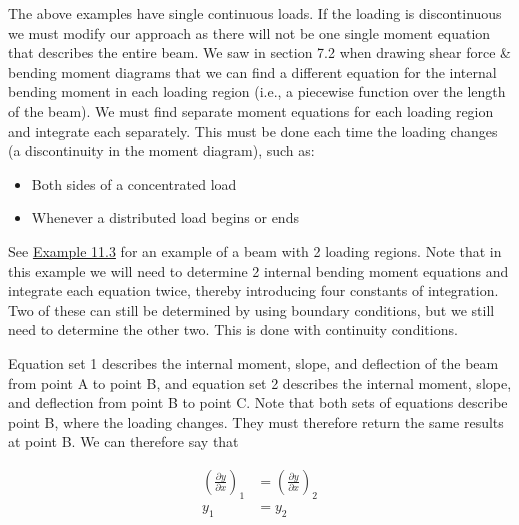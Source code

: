 \documentclass[
  letterpaper,
  DIV=11,
  numbers=noendperiod]{scrreprt}
\begin{document}
The above examples have single continuous loads. If the loading is
discontinuous we must modify our approach as there will not be one
single moment equation that describes the entire beam. We saw in section
7.2 when drawing shear force \& bending moment diagrams that we can find
a different equation for the internal bending moment in each loading
region (i.e., a piecewise function over the length of the beam). We must
find separate moment equations for each loading region and integrate
each separately. This must be done each time the loading changes (a
discontinuity in the moment diagram), such as:

\begin{itemize}
\item
  Both sides of a concentrated load
\item
  Whenever a distributed load begins or ends
\end{itemize}

See \hyperref[example-11.3]{Example 11.3} for an example of a beam with
2 loading regions. Note that in this example we will need to determine 2
internal bending moment equations and integrate each equation twice,
thereby introducing four constants of integration. Two of these can
still be determined by using boundary conditions, but we still need to
determine the other two. This is done with continuity conditions.

Equation set 1 describes the internal moment, slope, and deflection of
the beam from point A to point B, and equation set 2 describes the
internal moment, slope, and deflection from point B to point C. Note
that both sets of equations describe point B, where the loading changes.
They must therefore return the same results at point B. We can therefore
say that

\[
\begin{aligned}
\left(\frac{\partial y}{\partial x}\right)_{1} & =\left(\frac{\partial y}{\partial x}\right)_{2} \\
y_{1} & =y_{2}
\end{aligned}
\]
\end{document}
